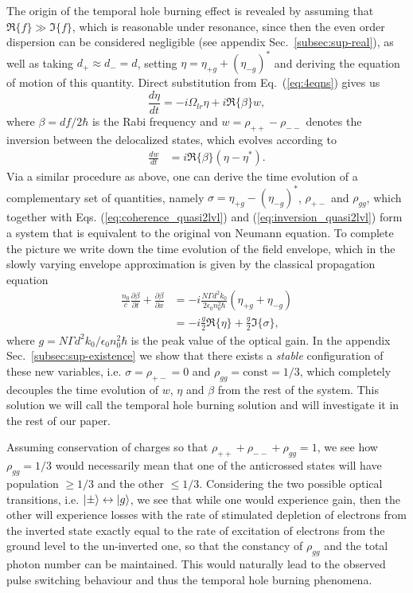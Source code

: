 \documentclass[onecolumn,secnumarabic,amssymb, nobibnotes, aip, prd]{revtex4-1}
\def\p{\partial}
\begin{document}
The origin of the temporal hole burning effect is revealed by assuming that $\Re\{f\} \gg \Im\{f\} $, which is reasonable under resonance, since then the even order dispersion can be considered negligible\cite{khurgin2005optical} (see appendix Sec.~\ref{subsec:sup-real}), as well as taking $d_{+}\approx d_{-} = d$, setting  $\eta = \eta_{+g}+(\eta_{-g})^*$ and deriving the equation of motion of this quantity. Direct substitution from Eq.~(\ref{eq:4eqns}) gives us
\begin{equation}
\label{eq:coherence_quasi2lvl}
\frac{d \eta}{dt} = -i\Omega_{lr} \eta + i\Re\{\beta\}w, 
\end{equation}
where  $\beta =d f/2\hbar$ is the Rabi frequency and $w = \rho_{++}-\rho_{--}$ denotes the inversion between the delocalized states, which evolves according to 
\begin{align}
\label{eq:inversion_quasi2lvl}
\frac{d w }{dt}	&=  i\Re\{\beta\}(\eta-\eta^*).
\end{align}
Via a similar procedure as above, one can derive the time evolution of a complementary set of quantities, namely $\sigma =\eta_{+g}-(\eta_{-g})^*$, $\rho_{+-}$ and $\rho_{gg}$, which together with Eqs. (\ref{eq:coherence_quasi2lvl}) and (\ref{eq:inversion_quasi2lvl}) form a system that is equivalent to the original von Neumann equation. To complete the picture we write down the time evolution of the field envelope, which in the slowly varying envelope approximation is given by the classical propagation equation~\cite{jirauschek2014modeling}
\begin{align}
\label{eq:propagation-eq}
\frac{n_0}{c}\frac{\p \beta}{\p t} + \frac{\p \beta}{\p x} &= - i\frac{N\Gamma d^2 k_0}{2\epsilon_0n_0^2\hbar}(\eta_{+g}+\eta_{-g}) \nonumber \\
&=  -i\frac{g}{2}\Re\{\eta\}+\frac{g}{2}\Im\{\sigma\},
\end{align}
where $g =N\Gamma d^2 k_0/\epsilon_0n_0^2\hbar $ is the peak value of the optical gain. In the appendix Sec.~\ref{subsec:sup-existence} we show that there exists a \emph{stable} configuration of these new variables, i.e. $\sigma = \rho_{+-} = 0$ and $\rho_{gg} = \text{const} = 1/3$, which completely decouples the time evolution of $w$, $\eta$ and $\beta$ from the rest of the system. This solution we will call the temporal hole burning solution and will investigate it in the rest of our paper.

Assuming conservation of charges so that $\rho_{++}+\rho_{--}+\rho_{gg} = 1$, we see how $\rho_{gg}= 1/3$  would necessarily mean that one of the anticrossed states will have population $\geq 1/3$ and the other $\leq 1/3$. Considering the two possible optical transitions, i.e.  $\ket{\pm}\leftrightarrow \ket{g}$, we see that while one would experience gain, then the other will experience losses with the rate of stimulated depletion of electrons from the inverted state exactly equal to the rate of excitation of electrons from the ground level to the un-inverted one, so that the constancy of $\rho_{gg}$ and the total photon number can be maintained. This would naturally lead to the observed pulse switching behaviour and thus the temporal hole burning phenomena. 
\end{document}
